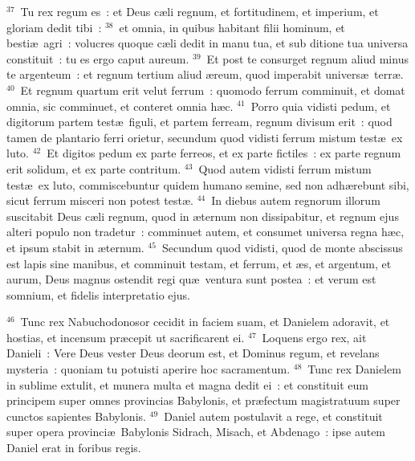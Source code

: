 ${}^{37}$~Tu rex regum es~: et Deus c\ae li regnum, et fortitudinem, et imperium, et gloriam dedit tibi~:
${}^{38}$~et omnia, in quibus habitant filii hominum, et besti\ae\ agri~: volucres quoque c\ae li dedit in manu tua, et sub ditione tua universa constituit~: tu es ergo caput aureum.
${}^{39}$~Et post te consurget regnum aliud minus te argenteum~: et regnum tertium aliud \ae reum, quod imperabit univers\ae\ terr\ae .
${}^{40}$~Et regnum quartum erit velut ferrum~: quomodo ferrum comminuit, et domat omnia, sic comminuet, et conteret omnia h\ae c.
${}^{41}$~Porro quia vidisti pedum, et digitorum partem test\ae\ figuli, et partem ferream, regnum divisum erit~: quod tamen de plantario ferri orietur, secundum quod vidisti ferrum mistum test\ae\ ex luto.
${}^{42}$~Et digitos pedum ex parte ferreos, et ex parte fictiles~: ex parte regnum erit solidum, et ex parte contritum.
${}^{43}$~Quod autem vidisti ferrum mistum test\ae\ ex luto, commiscebuntur quidem humano semine, sed non adh\ae rebunt sibi, sicut ferrum misceri non potest test\ae .
${}^{44}$~In diebus autem regnorum illorum suscitabit Deus c\ae li regnum, quod in \ae ternum non dissipabitur, et regnum ejus alteri populo non tradetur~: comminuet autem, et consumet universa regna h\ae c, et ipsum stabit in \ae ternum.
${}^{45}$~Secundum quod vidisti, quod de monte abscissus est lapis sine manibus, et comminuit testam, et ferrum, et \ae s, et argentum, et aurum, Deus magnus ostendit regi qu\ae\ ventura sunt postea~: et verum est somnium, et fidelis interpretatio ejus.


${}^{46}$~Tunc rex Nabuchodonosor cecidit in faciem suam, et Danielem adoravit, et hostias, et incensum pr\ae cepit ut sacrificarent ei.
${}^{47}$~Loquens ergo rex, ait Danieli~: Vere Deus vester Deus deorum est, et Dominus regum, et revelans mysteria~: quoniam tu potuisti aperire hoc sacramentum.
${}^{48}$~Tunc rex Danielem in sublime extulit, et munera multa et magna dedit ei~: et constituit eum principem super omnes provincias Babylonis, et pr\ae fectum magistratuum super cunctos sapientes Babylonis.
${}^{49}$~Daniel autem postulavit a rege, et constituit super opera provinci\ae\ Babylonis Sidrach, Misach, et Abdenago~: ipse autem Daniel erat in foribus regis.

